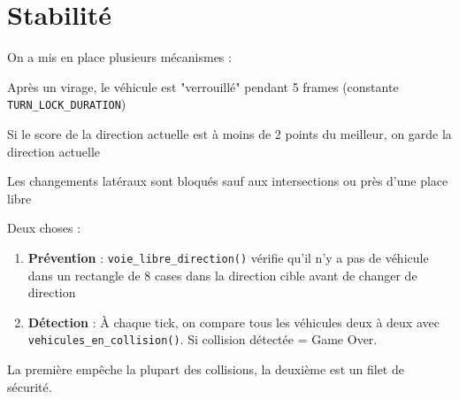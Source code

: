 \documentclass[11pt,a4paper]{article}
\newcommand{\code}[1]{\texttt{\textcolor{accent}{#1}}}
\begin{document}
\section{Stabilité}

\begin{questionbox}
\end{questionbox}

\begin{reponsebox}
On a mis en place plusieurs mécanismes :
\begin{description}[leftmargin=0.5cm, style=nextline]
    \item[\textcolor{primary}{\faIcon{lock} Lane-lock}] Après un virage, le véhicule est "verrouillé" pendant 5 frames (constante \code{TURN\_LOCK\_DURATION})
    \item[\textcolor{secondary}{\faIcon{balance-scale} Hystérésis}] Si le score de la direction actuelle est à moins de 2 points du meilleur, on garde la direction actuelle
    \item[\textcolor{success}{\faIcon{road} Lane-keeping}] Les changements latéraux sont bloqués sauf aux intersections ou près d'une place libre
\end{description}
\end{reponsebox}

\vspace{0.3cm}

\begin{questionbox}
\end{questionbox}

\begin{reponsebox}
Deux choses :
\begin{enumerate}[noitemsep]
    \item \textbf{Prévention} : \code{voie\_libre\_direction()} vérifie qu'il n'y a pas de véhicule dans un rectangle de 8 cases dans la direction cible avant de changer de direction
    \item \textbf{Détection} : À chaque tick, on compare tous les véhicules deux à deux avec \code{vehicules\_en\_collision()}. Si collision détectée = Game Over.
\end{enumerate}
La première empêche la plupart des collisions, la deuxième est un filet de sécurité.
\end{reponsebox}
\end{document}
